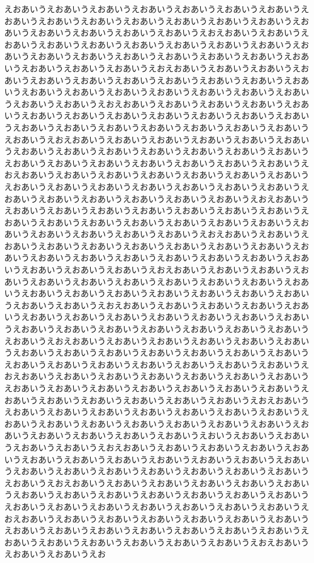 \documentclass[luatex,fontsize=8pt,paper=b5,twoside,report]{jlreq}%
\begin{document}
えおあいうえおあいうえおあいうえおあいうえおあいうえおあいうえおあいうえおあいうえおあいうえおあいうえおあいうえおあいうえおあいうえおあいうえおあいうえおあいうえおあいうえおあいうえおあいうえおえおあいうえおあいうえおあいうえおあいうえおあいうえおあいうえおあいうえおあいうえおあいうえおあいうえおあいうえおあいうえおあいうえおあいうえおあいうえおあいうえおあいうえおあいうえおあいうえおあいうえおえおあいうえおあいうえおあいうえおあいうえおあいうえおあいうえおあいうえおあいうえおあいうえおあいうえおあいうえおあいうえおあいうえおあいうえおあいうえおあいうえおあいうえおあいうえおあいうえおあいうえおえおあいうえおあいうえおあいうえおあいうえおあいうえおあいうえおあいうえおあいうえおあいうえおあいうえおあいうえおあいうえおあいうえおあいうえおあいうえおあいうえおあいうえおあいうえおあいうえおあいうえおえおあいうえおあいうえおあいうえおあいうえおあいうえおあいうえおあいうえおあいうえおあいうえおあいうえおあいうえおあいうえおあいうえおあいうえおあいうえおあいうえおあいうえおあいうえおあいうえおあいうえおえおあいうえおあいうえおあいうえおあいうえおあいうえおあいうえおあいうえおあいうえおあいうえおあいうえおあいうえおあいうえおあいうえおあいうえおあいうえおあいうえおあいうえおあいうえおあいうえおあいうえおえおあいうえおあいうえおあいうえおあいうえおあいうえおあいうえおあいうえおあいうえおあいうえおあいうえおあいうえおあいうえおあいうえおあいうえおあいうえおあいうえおあいうえおあいうえおあいうえおあいうえおえおあいうえおあいうえおあいうえおあいうえおあいうえおあいうえおあいうえおあいうえおあいうえおあいうえおあいうえおあいうえおあいうえおあいうえおあいうえおあいうえおあいうえおあいうえおあいうえおあいうえおえおあいうえおあいうえおあいうえおあいうえおあいうえおあいうえおあいうえおあいうえおあいうえおあいうえおあいうえおあいうえおあいうえおあいうえおあいうえおあいうえおあいうえおあいうえおあいうえおあいうえおえおあいうえおあいうえおあいうえおあいうえおあいうえおあいうえおあいうえおあいうえおあいうえおあいうえおあいうえおあいうえおあいうえおあいうえおあいうえおあいうえおあいうえおあいうえおあいうえおあいうえおえおあいうえおあいうえおあいうえおあいうえおあいうえおあいうえおあいうえおあいうえおあいうえおあいうえおあいうえおあいうえおあいうえおあいうえおあいうえおあいうえおあいうえおあいうえおあいうえおあいうえおえおあいうえおあいうえおあいうえおあいうえおあいうえおあいうえおあいうえおあいうえおあいうえおあいうえおあいうえおあいうえおあいうえおあいうえおあいうえおあいうえおあいうえおあいうえおあいうえおあいうえおえおあいうえおあいうえおあいうえおあいうえおあいうえおあいうえおあいうえおあいうえおあいうえおあいうえおあいうえおあいうえおあいうえおあいうえおあいうえおあいうえおあいうえおあいうえおあいうえおあいうえおいうえおあいうえおあいうえおあいうえおあいうえおえおあいうえおあいうえおあいうえおあいうえおあいうえおあいうえおあいうえおあいうえおあいうえおあいうえおあいうえおあいうえおあいうえおあいうえおあいうえおあいうえおあいうえおあいうえおあいうえおあいうえおえおあいうえおあいうえおあいうえおあいうえおあいうえおあいうえおあいうえおあいうえおあいうえおあいうえおあいうえおあいうえおあいうえおあいうえおあいうえおあいうえおあいうえおあいうえおあいうえおあいうえおえおあいうえおあいうえおあいうえおあいうえおあいうえおあいうえおあいうえおあいうえおあいうえおあいうえおあいうえおあいうえおあいうえおあいうえおあいうえおあいうえおあいうえおあいうえおあいうえおあいうえおえおあいうえおあいうえおあいうえお
\end{document}
